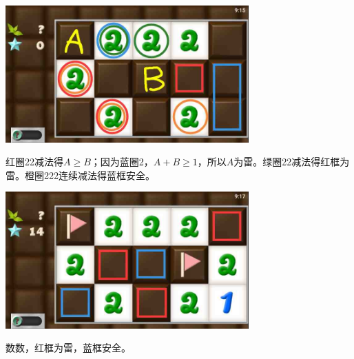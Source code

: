 \subsection{} %
\begin{center}
    \includegraphics[width=0.7\textwidth]{puzzlelow/119-1.jpg}
\end{center}
红圈22减法得$A\ge B$；因为蓝圈2，$A+B\ge 1$，所以$A$为雷。绿圈22减法得红框为雷。橙圈222连续减法得蓝框安全。
\begin{center}
    \includegraphics[width=0.7\textwidth]{puzzlelow/119-2.jpg}
\end{center}
数数，红框为雷，蓝框安全。

